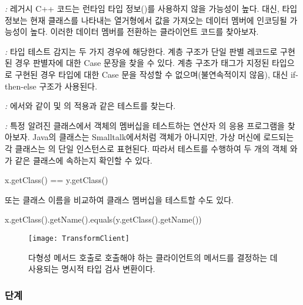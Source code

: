 \documentclass[a4paper,10pt,twoside]{book}
\begin{document}
\begin{bulletlist}
\item \emph{:}
레거시 C++ 코드는 런타임 타입 정보()를 사용하지 않을 가능성이 높다. 대신, 타입 정보는 현재 클래스를 나타내는 열거형에서 값을 가져오는 데이터 멤버에 인코딩될 가능성이 높다. 이러한 데이터 멤버를 전환하는 클라이언트 코드를 찾아보자.

\item \emph{:}
타입 테스트 감지는 두 가지 경우에 해당한다. 계층 구조가 단일 판별 레코드로 구현된 경우 판별자에 대한 Case 문장을 찾을 수 있다. 계층 구조가 태그가 지정된 타입으로 구현된 경우 타입에 대한 Case 문을 작성할 수 없으며(불연속적이지 않음), 대신 if-then-else 구조가 사용된다.

\item \emph{:}
에서와 같이  및 의 적용과  같은 테스트를 찾는다.

\item \emph{:}
특정 알려진 클래스에서 객체의 멤버십을 테스트하는 연산자 의 응용 프로그램을 찾아보자. Java의 클래스는 Smalltalk에서처럼 객체가 아니지만, 가상 머신에 로드되는 각 클래스는 의 단일 인스턴스로 표현된다. 따라서 테스트를 수행하여 두 개의 객체 와 가 같은 클래스에 속하는지 확인할 수 있다.
\begin{code}
x.getClass() == y.getClass()
\end{code}
또는 클래스 이름을 비교하여 클래스 멤버십을 테스트할 수도 있다.
\begin{code}
x.getClass().getName().equals(y.getClass().getName())
\end{code}

\end{bulletlist}

\begin{figure}[tb]
\begin{center}
\texttt{[image: TransformClient]}
\caption{다형성 메서드 호출로 호출해야 하는 클라이언트의 메서드를 결정하는 데 사용되는 명시적 타입 검사 변환이다.}
\end{center}
\end{figure}

\subsubsection*{단계}
\end{document}
